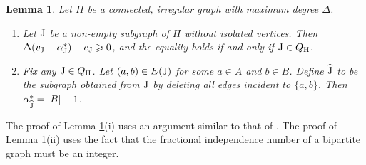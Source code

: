 \documentclass[a4paper,11pt,english,reqno]{amsart}
\numberwithin{equation}{section}
\renewcommand{\geq}{\geqslant}
\newcommand{\uH}{\textup{H}}
\newcommand{\tu}[1]{\textup{#1}}
\newtheorem{lemma}[theorem]{Lemma}
\begin{document}
		\begin{lemma}
			\label{s1:simplelowerbound}
			Let $H$ be a connected, irregular graph with maximum degree $\Delta$. 
			\begin{enumerate}
				\item[(i)] Let $\tu{J}$ be a non-empty subgraph of $H$ without isolated vertices. Then $			\Delta(v_{\tu{J}}-\alpha^{*}_{\tu{J}})-e_{\tu{J}}\geq 0$,
				and the equality holds if and only if  $\tu{J}\in Q_{\uH}$.
				\item[(ii)] Fix any $\tu{J} \in Q_{\uH}$. Let $(a,b) \in E(\tu{J})$ for some $a \in A$ and $b \in B$. Define $\widehat{\tu{J}}$ to be the subgraph obtained from $\tu{J}$ by deleting all edges incident to $\{a,b\}$. Then $\alpha^*_{\widehat{\tu{J}}}= |B|-1$.
			\end{enumerate}
		\end{lemma}
		The proof of Lemma \ref{s1:simplelowerbound}(i) uses an argument similar to that of \cite[Lemma~5.3]{HMS}. The proof of Lemma \ref{s1:simplelowerbound}(ii) uses the fact that the fractional independence number of a bipartite graph must be an integer.
\end{document}
